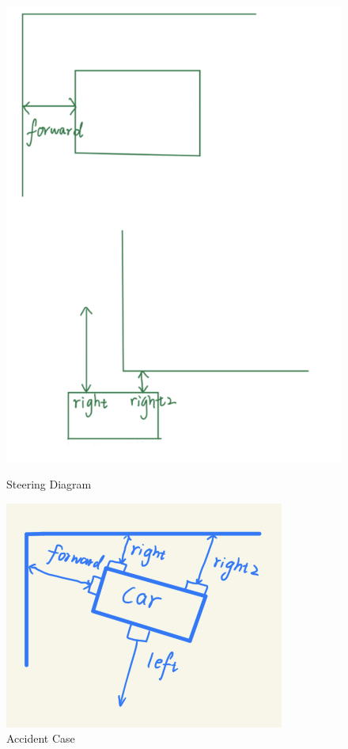 \documentclass[12pt, a4paper, oneside]{report}
\begin{document}
\begin{figure}[H]
    \begin{minipage}{0.48\textwidth}
        \centering
        \includegraphics[scale=0.35]{pic/Patio 2/Fig8.png}
        \caption{Steering Diagram}
        \label{steer}
    \end{minipage}
    \begin{minipage}{0.48\textwidth}
        \centering
        \includegraphics[scale=0.65]{pic/Patio 2/Fig9.png}
        \caption{Accident Case}
        \label{accic}
    \end{minipage}
\end{figure}
\end{document}
